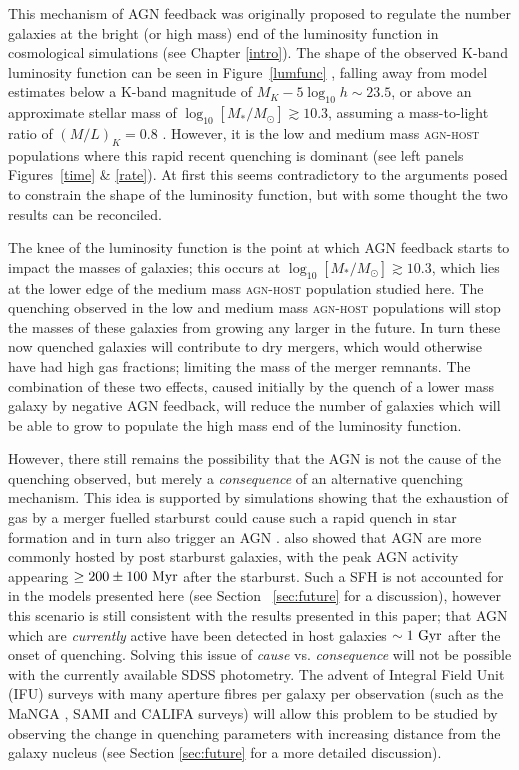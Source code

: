 This mechanism of AGN feedback was originally proposed to regulate the number galaxies at the bright (or high mass) end of the luminosity function in cosmological simulations (see Chapter \ref{intro}). The shape of the observed K-band luminosity function can be seen in Figure~\ref{lumfunc} \citep[Figure 1 from][]{benson03}, falling away from model estimates below a K-band magnitude of $M_K -5\log_{10} h \sim 23.5$, or above an approximate stellar mass of $\log_{10}[M_*/M_{\odot}] \gtrsim 10.3$, assuming a mass-to-light ratio of $(M/L)_K = 0.8$ \citep{brinchmann00}. However, it is the low and medium mass \textsc{agn-host} populations where this rapid recent quenching is dominant (see left panels Figures~\ref{time} \& \ref{rate}). At first this seems contradictory to the arguments posed to constrain the shape of the luminosity function, but with some thought the two results can be reconciled. 

The knee of the luminosity function is the point at which AGN feedback starts to impact the masses of galaxies; this occurs at $\log_{10}[M_*/M_{\odot}] \gtrsim 10.3$, which lies at the lower edge of the medium mass \textsc{agn-host} population studied here. The quenching observed in the low and medium mass \textsc{agn-host} populations will stop the masses of these galaxies from growing any larger in the future. In turn these now quenched galaxies will contribute to dry mergers, which would otherwise have had high gas fractions; limiting the mass of the merger remnants. The combination of these two effects, caused initially by the quench of a lower mass galaxy by negative AGN feedback, will reduce the number of galaxies which will be able to grow to populate the high mass end of the luminosity function. 

However, there still remains the possibility that the AGN is not the cause of the quenching observed, but merely a \emph{consequence} of an alternative quenching mechanism. This idea is supported by simulations showing that the exhaustion of gas by a merger fuelled starburst could cause such a rapid quench in star formation and in turn also trigger an AGN \citep{Croton06, Wild09, Snyder11, Hayward14}. \citet{Yesuf14} also showed that AGN are more commonly hosted by post starburst galaxies, with the peak AGN activity appearing $\geq 200 \pm 100 ~\rm{Myr}$ after the starburst. Such a SFH is not accounted for in the models presented here (see Section ~\ref{sec:future} for a discussion), however this scenario is still consistent with the results presented in this paper; that AGN which are \emph{currently} active have been detected in host galaxies $\sim 1~\rm{Gyr}$ after the onset of quenching. Solving this issue of \emph{cause} vs. \emph{consequence} will not be possible with the currently available SDSS photometry. The advent of Integral Field Unit (IFU) surveys with many aperture fibres per galaxy per observation (such as the MaNGA \citep{bundy15}, SAMI \citep{croom12} and CALIFA \citep{sanchez12} surveys) will allow this problem to be studied by observing the change in quenching parameters with increasing distance from the galaxy nucleus (see Section \ref{sec:future} for a more detailed discussion). 
 

